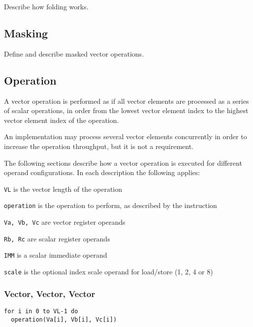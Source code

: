 \begin{todobox}
  Describe how folding works.
\end{todobox}

\subsection{Masking}

\begin{todobox}
  Define and describe masked vector operations.
\end{todobox}

\subsection{Operation}

A vector operation is performed as if all vector elements are processed as a
series of scalar operations, in order from the lowest vector element index to
the highest vector element index of the operation.

\begin{notebox}
  An implementation may process several vector elements concurrently in order
  to increase the operation throughput, but it is not a requirement.
\end{notebox}

The following sections describe how a vector operation is executed for different
operand configurations. In each description the following applies:

\begin{bulletitems}
  \item \texttt{VL} is the vector length of the operation
  \item \texttt{operation} is the operation to perform, as described by the instruction
  \item \texttt{Va, Vb, Vc} are vector register operands
  \item \texttt{Rb, Rc} are scalar register operands
  \item \texttt{IMM} is a scalar immediate operand
  \item \texttt{scale} is the optional index scale operand for load/store (1, 2, 4 or 8)
\end{bulletitems}

\subsubsection{Vector, Vector, Vector}

\begin{lstlisting}[style=pseudocode]
for i in 0 to VL-1 do
  operation(Va[i], Vb[i], Vc[i])
\end{lstlisting}

